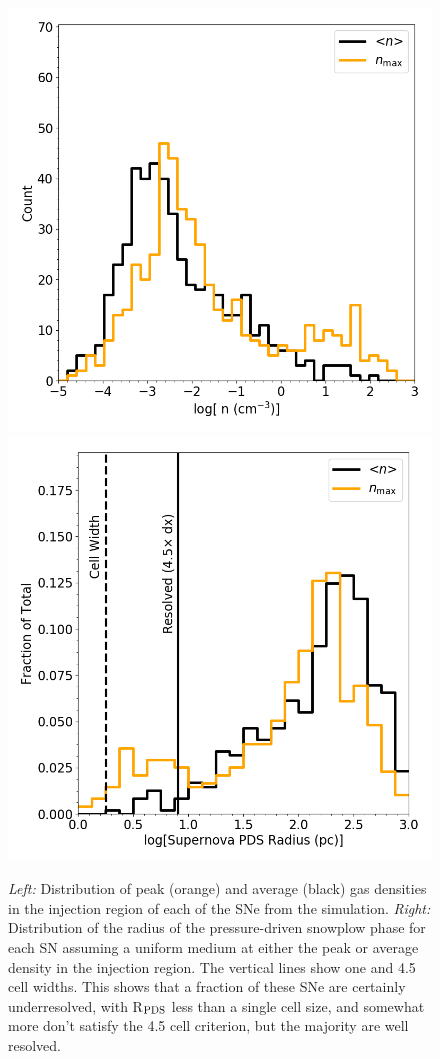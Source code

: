 \documentclass[twocolumn]{aastex61}
\begin{document}
\begin{figure}
\centering
\includegraphics[width=0.4\linewidth]{sn_density_hist}
\includegraphics[width=0.4\linewidth]{sn_radius_hist}
\caption{{\em Left:} Distribution of peak (orange) and average (black) gas densities in the injection region of each of the SNe from the simulation. {\em Right:} Distribution of the radius of the pressure-driven snowplow phase for each SN assuming a uniform medium at either the peak or average density in the injection region. The vertical lines show one and 4.5 cell widths. This shows that a fraction of these SNe are certainly underresolved, with R$_{\rm PDS}$ less than a single cell size, and somewhat more don't satisfy the 4.5 cell criterion, but the majority are well resolved.}
\label{fig:SN histogram}
\end{figure}

%
%
\end{document}
